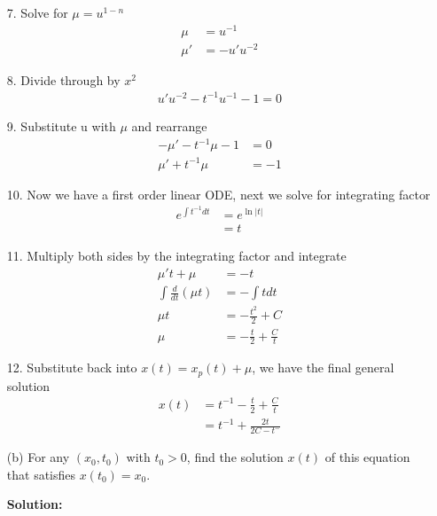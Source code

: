 \documentclass[12pt]{article}
\begin{document}
\begin{enumerate}
          7. Solve for $\mu{} = u^{1-n}$
          \begin{align*}
              \mu{}  & = u^{-1}    \\
              \mu{}' & = -u'u^{-2}
          \end{align*}

          8. Divide through by $x^2$
          \begin{align*}
              u'u^{-2}-t^{-1}u^{-1}-1=0
          \end{align*}

          9. Substitute u with $\mu{}$ and rearrange
          \begin{align*}
              -\mu{}'-t^{-1}\mu{}-1 & = 0  \\
              \mu{} '+t^{-1}\mu{}   & = -1
          \end{align*}

          10. Now we have a first order linear ODE, next we solve for integrating factor
          \begin{align*}
              e^{\int{t^{-1}dt}} & = e^{\ln{|t|}} \\
                                 & = t
          \end{align*}

          11. Multiply both sides by the integrating factor and integrate
          \begin{align*}
              \mu{}'t+\mu{}              & = -t                         \\
              \int{}\frac{d}{dt}(\mu{}t) & = -\int{tdt}                 \\
              \mu{}t                     & = -\frac{t^2}{2} + C         \\
              \mu{}                      & = -\frac{t}{2} + \frac{C}{t}
          \end{align*}

          12. Substitute back into $x(t) = x_p(t) + \mu{}$, we have the final general solution
          \begin{align*}
              x(t) & = t^{-1} -\frac{t}{2} + \frac{C}{t} \\
                   & = t^{-1} + \frac{2t}{2C-t^{-}}
          \end{align*}


    \item[(b)] For any $(x_0, t_0)$ with $t_0 > 0$, find the solution $x(t)$ of this equation that satisfies $x(t_0) = x_0$.

          \textbf{Solution:}


\end{enumerate}
\end{document}
